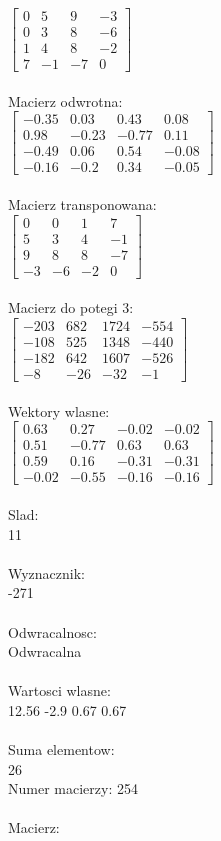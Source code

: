 \documentclass[a4paper,12pt]{article}
\begin{document}
$\begin{bmatrix} 0&5&9&-3\\0&3&8&-6\\1&4&8&-2\\7&-1&-7&0 \end{bmatrix}$
\\
\\
Macierz odwrotna:\\

$\begin{bmatrix} -0.35&0.03&0.43&0.08\\0.98&-0.23&-0.77&0.11\\-0.49&0.06&0.54&-0.08\\-0.16&-0.2&0.34&-0.05 \end{bmatrix}$
\\
\\
Macierz transponowana:\\

$\begin{bmatrix} 0&0&1&7\\5&3&4&-1\\9&8&8&-7\\-3&-6&-2&0 \end{bmatrix}$
\\
\\
Macierz do potegi 3:\\

$\begin{bmatrix} -203&682&1724&-554\\-108&525&1348&-440\\-182&642&1607&-526\\-8&-26&-32&-1 \end{bmatrix}$
\\
\\
Wektory wlasne:\\

$\begin{bmatrix} 0.63&0.27&-0.02&-0.02\\0.51&-0.77&0.63&0.63\\0.59&0.16&-0.31&-0.31\\-0.02&-0.55&-0.16&-0.16 \end{bmatrix}$
\\
\\
Slad:\\
11
\\
\\
Wyznacznik:\\
-271
\\
\\
Odwracalnosc:\\
Odwracalna
\\
\\
Wartosci wlasne:\\
12.56 -2.9 0.67 0.67
\\
\\
Suma elementow:\\
26
\\
\newpage
Numer macierzy:
254
\\
\\
Macierz:\\
\end{document}
